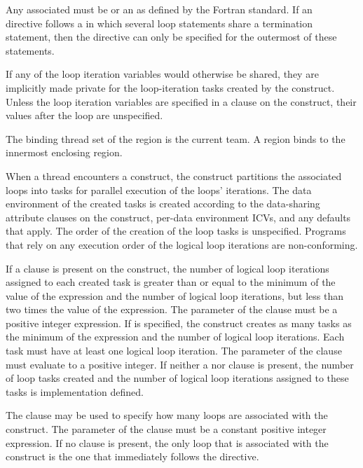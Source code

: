 Any associated  must be  or an 
 as defined by the Fortran standard. 
If an ~ directive follows a  
in which several loop statements share a  
termination statement, then the directive can only be specified for the 
outermost of these  statements.

If any of the loop iteration variables would otherwise be shared, they are implicitly made private for the loop-iteration tasks created by the  construct. Unless the loop iteration variables are specified in a  clause on the  construct, their values after the loop are unspecified.
\fortranspecificend

\binding
The binding thread set of the  region is the current team. A  region binds to the innermost enclosing  region.

\descr
When a thread encounters a  construct, the construct partitions the associated loops into tasks for parallel execution of the loops' iterations. The data environment of the created tasks is created according to the data-sharing attribute clauses on the  construct, per-data environment ICVs, and any defaults that apply. The order of the creation of the loop tasks is unspecified.
Programs that rely on any execution order of the logical loop iterations are non-conforming. 

If a  clause is present on the  construct, the number of logical loop iterations assigned to each created task is greater than or equal to the minimum of the value of the  expression and the number of logical loop iterations, but less than two times the value of the  expression.
The parameter of the  clause must be a positive integer expression.
If  is specified, the  construct creates as many tasks as the minimum of the  expression and the number of logical loop iterations.  
Each task must have at least one logical loop iteration.
The parameter of the  clause must evaluate to a positive integer.
If neither a  nor  clause is present, the number of loop tasks created and the number of logical loop iterations assigned to these tasks is implementation defined.

The  clause may be used to specify how many loops are associated with the  construct. The parameter of the  clause must be a constant positive integer expression. If no  clause is present, the only loop that is associated with the  construct is the one that immediately follows the  directive.

